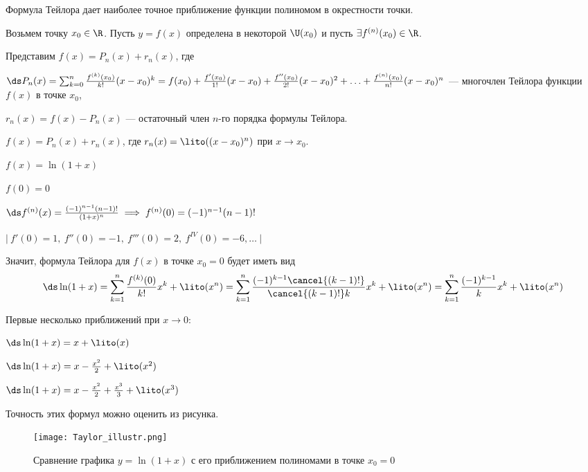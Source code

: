 Формула Тейлора дает наиболее точное приближение функции полиномом в окрестности точки.

Возьмем точку $x_0 \in \R$. Пусть $y = f(x)$ определена в некоторой $\U(x_0)$ и пусть $\exists f^{(n)}(x_0) \in \R$.

Представим $f(x) = P_n(x) + r_n(x)$, где

\Def $\ds P_n(x) = \sum_{k=0}^{n} \frac{f^{(k)}(x_0)}{k!}(x-x_0)^k = f(x_0) + \frac{f'(x_0)}{1!} (x-x_0) + \frac{f''(x_0)}{2!} (x-x_0)^2 + \ldots + \frac{f^{(n)}(x_0)}{n!} (x-x_0)^n$ --- многочлен Тейлора функции $f(x)$ в точке $x_0$,

\Def $r_n(x) = f(x) - P_n(x)$ --- остаточный член $n$-го порядка формулы Тейлора.


$f(x) = P_n(x) + r_n(x)$, где $r_n(x) = \lito((x-x_0)^n)$ при $x \to x_0$.

\newpage

\Example $f(x) = \ln(1+x)$

$f(0) = 0$

$\ds f^{(n)}(x) = \frac{(-1)^{n-1} (n-1)!}{(1+x)^n} \implies f^{(n)}(0) = (-1)^{n-1} (n-1)!$

$\bigg|\ f'(0) = 1,\ f''(0) = -1,\ f'''(0) = 2,\ f^{IV}(0) = -6, \ldots \ \bigg|$


Значит, формула Тейлора для $f(x)$ в точке $x_0 = 0$ будет иметь вид $$\ds \ln(1+x) = \sum_{k=1}^{n} \frac{f^{(k)}(0)}{k!} x^k + \lito(x^n) = \sum_{k=1}^{n} \frac{(-1)^{k-1} \cancel{(k-1)!}}{\cancel{(k-1)!} k} x^k + \lito(x^n) = \sum_{k=1}^{n} \frac{(-1)^{k-1}}{k} x^k + \lito(x^n)$$

Первые несколько приближений при $x \to 0$:

$\ds \ln(1+x) = x + \lito(x)$

$\ds \ln(1+x) = x - \frac{x^2}{2} + \lito(x^2)$

$\ds \ln(1+x) = x - \frac{x^2}{2} + \frac{x^3}{3} + \lito(x^3)$

Точность этих формул можно оценить из рисунка.

\begin{figure}[h]
  \begin{center}
    \texttt{[image: Taylor\_illustr.png]}
  \end{center}
  \caption{Сравнение графика $y=\ln(1+x)$ с его приближением полиномами в точке $x_0 = 0$}
\end{figure}

